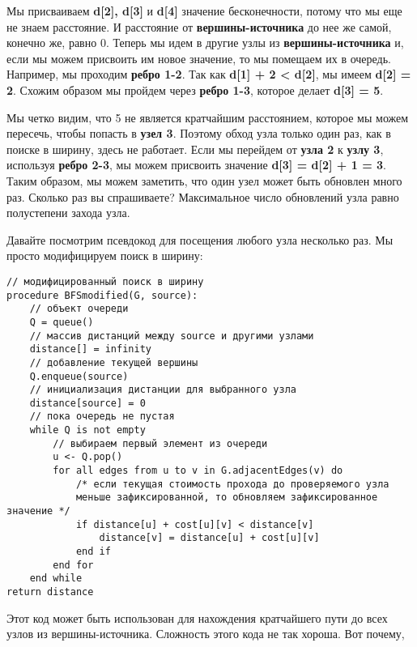 \vspace{\baselineskip}
Мы присваиваем \textbf{d[2], d[3]} и\textbf{ d[4]} значение бесконечности, потому что мы еще не знаем расстояние. И расстояние от \textbf{вершины-источника} до нее же самой, конечно же, равно 0. Теперь мы идем в другие узлы из \textbf{вершины-источника} и, если мы можем присвоить им новое значение, то мы помещаем их в очередь. Например, мы проходим \textbf{ребро 1-2}. Так как \textbf{d[1] + 2 < d[2]}, мы имеем \textbf{d[2] = 2}. Схожим образом мы пройдем через \textbf{ребро 1-3}, которое делает \textbf{d[3] = 5}.

\vspace{\baselineskip}
Мы четко видим, что 5 не является кратчайшим расстоянием, которое мы можем пересечь, чтобы попасть в \textbf{узел 3}. Поэтому обход узла только один раз, как в поиске в ширину, здесь не работает. Если мы перейдем от \textbf{узла 2} к \textbf{узлу 3}, используя \textbf{ребро 2-3}, мы можем присвоить значение \textbf{d[3] = d[2] + 1 = 3}. Таким образом, мы можем заметить, что один узел может быть обновлен много раз. Сколько раз вы спрашиваете? Максимальное число обновлений узла равно полустепени захода узла.

\vspace{\baselineskip}
Давайте посмотрим псевдокод для посещения любого узла несколько раз. Мы просто модифицируем поиск в ширину:

\vspace{\baselineskip}
\begin{tcolorbox}
\begin{verbatim} 
// модифицированный поиск в ширину
procedure BFSmodified(G, source):
	// объект очереди
	Q = queue()
	// массив дистанций между source и другими узлами
	distance[] = infinity
	// добавление текущей вершины
	Q.enqueue(source)
	// инициализация дистанции для выбранного узла 
	distance[source] = 0
	// пока очередь не пустая 
	while Q is not empty
		// выбираем первый элемент из очереди
		u <- Q.pop()
		for all edges from u to v in G.adjacentEdges(v) do
			/* если текущая стоимость прохода до проверяемого узла 
			меньше зафиксированной, то обновляем зафиксированное значение */
			if distance[u] + cost[u][v] < distance[v]
				distance[v] = distance[u] + cost[u][v]
			end if
		end for
	end while
return distance
\end{verbatim}
\end{tcolorbox}

\vspace{\baselineskip}
Этот код может быть использован для нахождения кратчайшего пути до всех узлов из вершины-источника. Сложность этого кода не так хороша. Вот почему,

